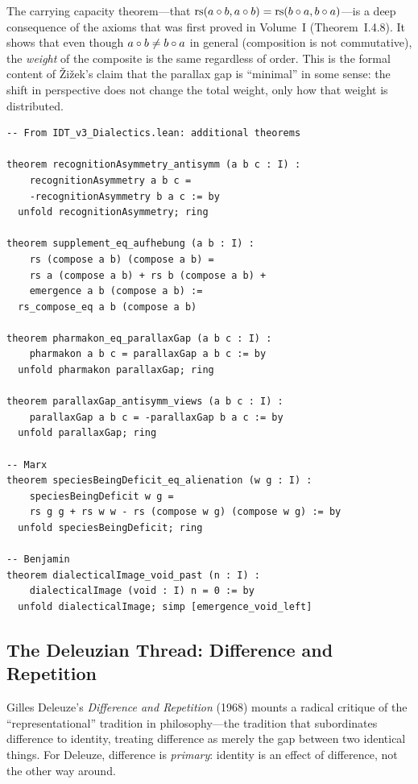 \begin{remark}
The carrying capacity theorem---that $\mathrm{rs}(a \circ b, a \circ b) =
\mathrm{rs}(b \circ a, b \circ a)$---is a deep consequence of the axioms that
was first proved in Volume~I (Theorem~I.4.8). It shows that even though
$a \circ b \neq b \circ a$ in general (composition is not commutative),
the \emph{weight} of the composite is the same regardless of order. This is
the formal content of \v{Z}i\v{z}ek's claim that the parallax gap is
``minimal'' in some sense: the shift in perspective does not change the total
weight, only how that weight is distributed.
\end{remark}

\begin{lstlisting}
-- From IDT_v3_Dialectics.lean: additional theorems

theorem recognitionAsymmetry_antisymm (a b c : I) :
    recognitionAsymmetry a b c =
    -recognitionAsymmetry b a c := by
  unfold recognitionAsymmetry; ring

theorem supplement_eq_aufhebung (a b : I) :
    rs (compose a b) (compose a b) =
    rs a (compose a b) + rs b (compose a b) +
    emergence a b (compose a b) :=
  rs_compose_eq a b (compose a b)

theorem pharmakon_eq_parallaxGap (a b c : I) :
    pharmakon a b c = parallaxGap a b c := by
  unfold pharmakon parallaxGap; ring

theorem parallaxGap_antisymm_views (a b c : I) :
    parallaxGap a b c = -parallaxGap b a c := by
  unfold parallaxGap; ring

-- Marx
theorem speciesBeingDeficit_eq_alienation (w g : I) :
    speciesBeingDeficit w g =
    rs g g + rs w w - rs (compose w g) (compose w g) := by
  unfold speciesBeingDeficit; ring

-- Benjamin
theorem dialecticalImage_void_past (n : I) :
    dialecticalImage (void : I) n = 0 := by
  unfold dialecticalImage; simp [emergence_void_left]
\end{lstlisting}

\subsection{The Deleuzian Thread: Difference and Repetition}

Gilles Deleuze's \textit{Difference and Repetition} (1968) mounts a radical
critique of the ``representational'' tradition in philosophy---the tradition
that subordinates difference to identity, treating difference as merely the
gap between two identical things. For Deleuze, difference is \emph{primary}:
identity is an effect of difference, not the other way around.


